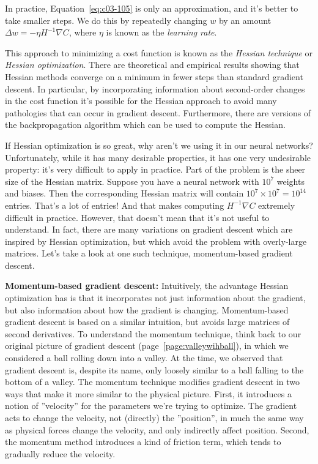 In practice, Equation~\ref{eq:c03-105} is only an approximation, and it's better to take smaller steps. We do this by repeatedly changing $w$ by an amount $\Delta w = -\eta H^{-1} \nabla C$, where $\eta$ is known as the \textit{learning rate}.

This approach to minimizing a cost function is known as the \textit{Hessian technique} or \textit{Hessian optimization}. There are theoretical and empirical results showing that Hessian methods converge on a minimum in fewer steps than standard gradient descent. In particular, by incorporating information about second-order changes in the cost function it's possible for the Hessian approach to avoid many pathologies that can occur in gradient descent. Furthermore, there are versions of the backpropagation algorithm which can be used to compute the Hessian.

If Hessian optimization is so great, why aren't we using it in our neural networks? Unfortunately, while it has many desirable properties, it has one very undesirable property: it's very difficult to apply in practice. Part of the problem is the sheer size of the Hessian matrix. Suppose you have a neural network with $10^7$ weights and biases. Then the corresponding Hessian matrix will contain $10^7 \times 10^7 = 10^{14}$ entries. That's a lot of entries! And that makes computing $H^{-1} \nabla C$ extremely difficult in practice. However, that doesn't mean that it's not useful to understand. In fact, there are many variations on gradient descent which are inspired by Hessian optimization, but which avoid the problem with overly-large matrices. Let's take a look at one such technique, momentum-based gradient descent.
 
\textbf{Momentum-based gradient descent:} Intuitively, the advantage Hessian optimization has is that it incorporates not just information about the gradient, but also information about how the gradient is changing. Momentum-based gradient descent is based on a similar intuition, but avoids large matrices of second derivatives. To understand the momentum technique, think back to our original picture of gradient descent (page~\ref{page:valleywihball}), in which we considered a ball rolling down into a valley. At the time, we observed that gradient descent is, despite its name, only loosely similar to a ball falling to the bottom of a valley. The momentum technique modifies gradient descent in two ways that make it more similar to the physical picture. First, it introduces a notion of ''velocity'' for the parameters we're trying to optimize. The gradient acts to change the velocity, not (directly) the ''position'', in much the same way as physical forces change the velocity, and only indirectly affect position. Second, the momentum method introduces a kind of friction term, which tends to gradually reduce the velocity.
   
